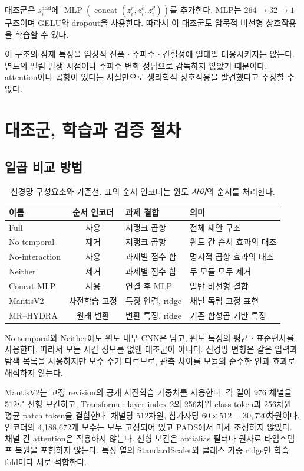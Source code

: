 \documentclass[11pt,a4paper]{article}
\newcommand{\code}[1]{\texttt{\detokenize{#1}}}
\DeclareMathOperator{\concat}{concat}
\numberwithin{equation}{section}
\begin{document}
\code{concat_mlp} 대조군은 $s_i^{\mathrm{add}}$에
$\operatorname{MLP}(\concat(z_i^r,z_i^c,z_i^p))$를 추가한다.
MLP는 $264\to32\to1$ 구조이며 GELU와 dropout을 사용한다.
따라서 이 대조군도 암묵적 비선형 상호작용을 학습할 수 있다.

이 구조의 잠재 특징을 임상적 진폭ㆍ주파수ㆍ간헐성에 일대일 대응시키지는 않는다.
별도의 떨림 발생 시점이나 주파수 변화 정답으로 감독하지 않았기 때문이다.
attention이나 곱항이 있다는 사실만으로 생리학적 상호작용을 발견했다고 주장할 수 없다.

\section{대조군, 학습과 검증 절차}
\subsection{일곱 비교 방법}
\begin{table}[H]\centering\small
\caption{신경망 구성요소와 기준선. 표의 순서 인코더는 윈도 \emph{사이}의 순서를 처리한다.}
\begin{tabularx}{\linewidth}{@{}lclX@{}}\toprule
 이름 & 순서 인코더 & 과제 결합 & 의미\\\midrule
 Full & 사용 & 저랭크 곱항 & 전체 제안 구조\\
 No-temporal & 제거 & 저랭크 곱항 & 윈도 간 순서 효과의 대조\\
 No-interaction & 사용 & 과제별 점수 합 & 명시적 곱항 효과의 대조\\
 Neither & 제거 & 과제별 점수 합 & 두 모듈 모두 제거\\
 Concat-MLP & 사용 & 연결 후 MLP & 일반 비선형 결합\\
 MantisV2 & 사전학습 고정 & 특징 연결, ridge & 채널 독립 고정 표현\\
 MR--HYDRA & 원래 변환 & 변환 특징, ridge & 기존 합성곱 기반 특징\\\bottomrule
\end{tabularx}\label{tab:variants}
\end{table}
No-temporal와 Neither에도 윈도 내부 CNN은 남고, 윈도 특징의 평균ㆍ표준편차를
사용한다. 따라서 모든 시간 정보를 없앤 대조군이 아니다.
신경망 변형은 같은 입력과 탐색 목록을 사용하지만 모수 수가 다르므로,
관측 차이를 모듈의 순수한 인과 효과로 해석하지 않는다.

MantisV2\cite{mantis}는 고정 revision의 공개 사전학습 가중치를 사용한다.
각 길이 976 채널을 512로 선형 보간하고, Transformer layer index 2의
256차원 class token과 256차원 평균 patch token을 결합한다.
채널당 512차원, 참가자당 $60\times512=30{,}720$차원이다.
인코더의 4,188,672개 모수는 모두 고정되어 있고 PADS에서 미세 조정하지 않았다.
채널 간 attention은 적용하지 않는다. 선형 보간은 antialias 필터나
원자료 타임스탬프 복원을 포함하지 않는다. 특징 열의 StandardScaler와
클래스 가중 ridge만 학습 fold마다 새로 적합한다.
\end{document}
